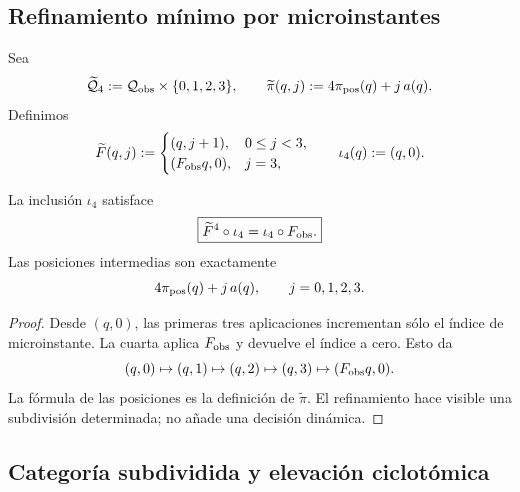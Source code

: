 \subsection{Refinamiento mínimo por microinstantes}

\begin{definition}
\label{p12-83-c1-s12:def:u006c-estado-subdividido}
Sea
\begin{equation}
 \widetilde{\mathcal Q}_4
 :=\mathcal Q_{\rm obs}\times\{0,1,2,3\},
 \qquad
 \widetilde\pi(q,j)
 :=4\pi_{\rm pos}(q)+j\,a(q).
 \label{p12-83-c1-s12:eq:u006c-estado-refinado}
\end{equation}
Definimos
\begin{equation}
 \widetilde F(q,j):=
 \begin{cases}
  (q,j+1),&0\leq j<3,\\
  (F_{\rm obs}q,0),&j=3,
 \end{cases}
 \qquad
 \iota_4(q):=(q,0).
 \label{p12-83-c1-s12:eq:u006c-dinamica-refinada}
\end{equation}
\end{definition}

\begin{theorem}
\label{p12-83-c1-s12:thm:u006c-semiconjugacion}
La inclusión \(\iota_4\) satisface
\begin{equation}
 \boxed{
 \widetilde F^4\circ\iota_4
 =\iota_4\circ F_{\rm obs}.}
 \label{p12-83-c1-s12:eq:u006c-semiconjugacion}
\end{equation}
Las posiciones intermedias son exactamente
\[
 4\pi_{\rm pos}(q)+j\,a(q),
 \qquad j=0,1,2,3.
\]
\end{theorem}

\begin{proof}
Desde \((q,0)\), las primeras tres aplicaciones incrementan sólo el índice
de microinstante. La cuarta aplica \(F_{\rm obs}\) y devuelve el índice a
cero. Esto da
\[
 (q,0)\mapsto(q,1)\mapsto(q,2)\mapsto(q,3)
 \mapsto(F_{\rm obs}q,0).
\]
La fórmula de las posiciones es la definición de
\(\widetilde\pi\). El refinamiento hace visible una subdivisión determinada;
no añade una decisión dinámica.
\end{proof}

\subsection{Categoría subdividida y elevación ciclotómica}

